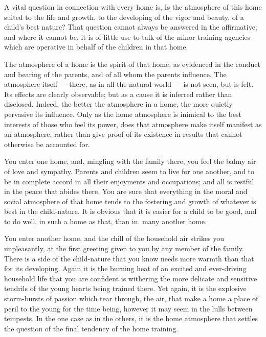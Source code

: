 \documentclass[
]{book}
\begin{document}
A vital question in connection with every home is, Is the atmosphere of this home suited to the life and growth, to the developing of the vigor and beauty, of a child's best nature? That question cannot always be answered in the affirmative; and where it cannot be, it is of little use to talk of the minor training agencies which are operative in behalf of the children in that home.

The atmosphere of a home is the spirit of that home, as evidenced in the conduct and bearing of the parents, and of all whom the parents influence. The atmosphere itself --- there, as in all the natural world --- is not seen, but is felt. Its effects are clearly observable; but as a cause it is inferred rather than disclosed. Indeed, the better the atmosphere in a home, the more quietly pervasive its influence. Only as the home atmosphere is inimical to the best interests of those who feel its power, does that atmosphere make itself manifest as an atmosphere, rather than give proof of its existence in results that cannot otherwise be accounted for.

You enter one home, and, mingling with the family there, you feel the balmy air of love and sympathy. Parents and children seem to live for one another, and to be in complete accord in all their enjoyments and occupations; and all is restful in the peace that abides there. You are sure that everything in the moral and social atmosphere of that home tends to the fostering and growth of whatever is best in the child-nature. It is obvious that it is easier for a child to be good, and to do well, in such a home as that, than in. many another home.

You enter another home, and the chill of the household air strikes you unpleasantly, at the first greeting given to you by any member of the family. There is a side of the child-nature that you know needs more warmth than that for its developing. Again it is the burning heat of an excited and ever-driving household life that you are confident is withering the more delicate and sensitive tendrils of the young hearts being trained there. Yet again, it is the explosive storm-bursts of passion which tear through, the air, that make a home a place of peril to the young for the time being, however it may seem in the lulls between tempests. In the one case as in the others, it is the home atmosphere that settles the question of the final tendency of the home training.
\end{document}
